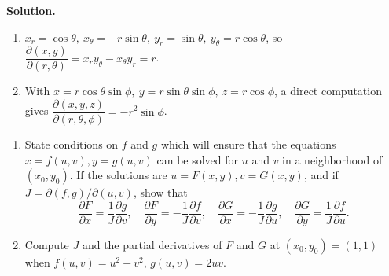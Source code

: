 \noindent\textbf{Solution.}
\begin{enumerate}[label=(\alph*)]
    \item $x_r=\cos\theta,\ x_\theta=-r\sin\theta,\ y_r=\sin\theta,\ y_\theta=r\cos\theta$, so
    $\dfrac{\partial(x,y)}{\partial(r,\theta)}=x_r y_\theta-x_\theta y_r=r$.
    \item With $x=r\cos\theta\sin\phi,\ y=r\sin\theta\sin\phi,\ z=r\cos\phi$, a direct computation gives
    $\dfrac{\partial(x,y,z)}{\partial(r,\theta,\phi)}=-r^2\sin\phi$.
\end{enumerate}

\begin{problembox}
\begin{enumerate}[label=(\alph*)]
    \item State conditions on \( f \) and \( g \) which will ensure that the equations \( x = f(u, v), y = g(u, v) \) can be solved for \( u \) and \( v \) in a neighborhood of \( (x_0, y_0) \). If the solutions are \( u = F(x, y), v = G(x, y) \), and if \( J = \partial (f, g)/\partial (u, v) \), show that
    \[\frac{\partial F}{\partial x} = \frac{1}{J} \frac{\partial g}{\partial v}, \quad \frac{\partial F}{\partial y} = -\frac{1}{J} \frac{\partial f}{\partial v}, \quad \frac{\partial G}{\partial x} = -\frac{1}{J} \frac{\partial g}{\partial u}, \quad \frac{\partial G}{\partial y} = \frac{1}{J} \frac{\partial f}{\partial u}.\]
    \item Compute \( J \) and the partial derivatives of \( F \) and \( G \) at \((x_0, y_0) = (1, 1)\) when \( f(u, v) = u^2 - v^2 \), \( g(u, v) = 2uv \).
\end{enumerate}
\end{problembox}


